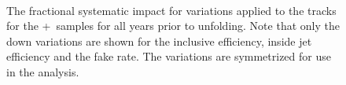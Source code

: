 \begin{figure}[h!]
  \centering
   \\
  \caption{The fractional systematic impact for variations applied to the tracks for the \powheg+\pythia~samples for all years prior to unfolding. Note that only the down variations are shown for the inclusive efficiency, inside jet efficiency and the fake rate.
  The variations are symmetrized for use in the analysis.}
  \label{fig:PP8TrackSyst}
\end{figure}

